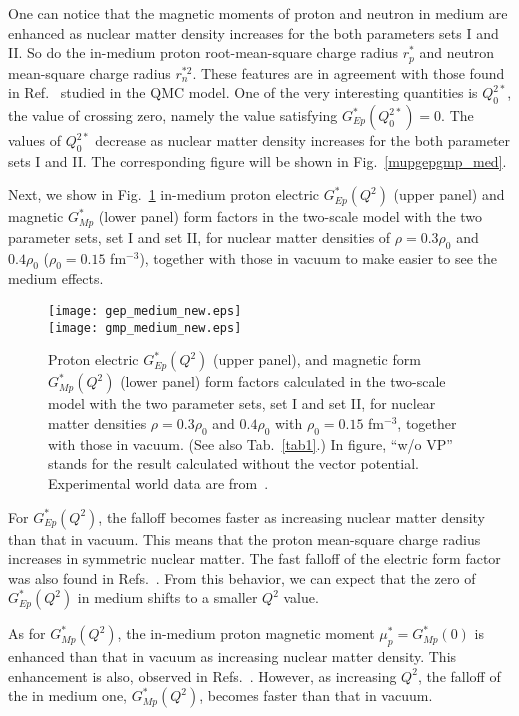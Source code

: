 \documentclass[preprint,aps,showpacs,floatfix]{revtex4}
\begin{document}
One can notice that the magnetic moments of proton and neutron in medium 
are enhanced as nuclear matter density increases for the both parameters sets I and II.
So do the in-medium proton root-mean-square charge radius $r^*_p$  
and neutron mean-square charge radius $r_n^{* 2}$. 
These features are in agreement with those found in Ref.~\cite{Ding} 
studied in the QMC model. 
One of the very interesting quantities is $Q_0^{2 *}$, the value 
of crossing zero, namely the value satisfying $G^*_{Ep}(Q_0^{2 *}) = 0$.
The values of $Q_0^{2 *}$ decrease as nuclear matter density increases   
for the both parameter sets I and II. 
The corresponding figure will be shown in Fig.~\ref{mupgepgmp_med}.

Next, we show in Fig.~\ref{gepgmp_medium} in-medium proton electric 
$G^*_{Ep}(Q^2)$ (upper panel) and magnetic $G^*_{Mp}$ (lower panel) form factors 
in the two-scale model with the two parameter sets, set I and set II,  
for nuclear matter densities of $\rho=0.3\rho_0$ and $0.4\rho_0$ ($\rho_0=0.15$ fm$^{-3}$), 
together with those in vacuum to make easier to see the medium effects.
\begin{figure}[htbp]
\texttt{[image: gep\_medium\_new.eps]}
\\
\vspace*{1.5cm}
\texttt{[image: gmp\_medium\_new.eps]}
\caption{
Proton electric $G^*_{Ep}(Q^2)$ (upper panel),  
and magnetic form $G^*_{Mp}(Q^2)$ (lower panel) form factors  
calculated in the two-scale model with the two parameter sets, set I and set II,  
for nuclear matter densities $\rho = 0.3\rho_0$ and $0.4\rho_0$ with $\rho_0=0.15$ fm$^{-3}$, 
together with those in vacuum. (See also Tab.~\ref{tab1}.) 
In figure, ``w/o VP'' stands for the result calculated without the vector potential.  
Experimental world data are 
from~\cite{Arrington2007,MainzR1,Passchier99,Eden94,JlabR2,Riordan10,Schiavilla01}.
}  
\label{gepgmp_medium}
\end{figure}
For $G^*_{Ep}(Q^2)$, the falloff becomes faster as increasing nuclear matter density than   
that in vacuum. This means that the proton mean-square charge radius 
increases in symmetric nuclear matter.
The fast falloff of the electric form factor was also 
found in Refs.~\cite{Ding,Gilberto}.
From this behavior, we can expect that the zero of $G^*_{Ep}(Q^2)$ in medium 
shifts to a smaller $Q^2$ value.

As for $G^*_{Mp}(Q^2)$, the in-medium proton magnetic moment $\mu^*_p = G^*_{Mp}(0)$ is 
enhanced than that in vacuum as increasing nuclear matter density. 
This enhancement is also, observed in Refs.~\cite{Ding,Gilberto}.
However, as increasing $Q^2$, the falloff of the in medium one, $G^*_{Mp}(Q^2)$,  
becomes faster than that in vacuum.
\end{document}
